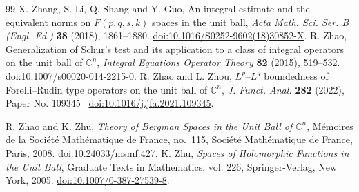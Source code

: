 \documentclass[preprint,12pt,times]{elsarticle}
\theoremstyle{definition}
\theoremstyle{remark}
\numberwithin{equation}{section}
\begin{document}
\begin{thebibliography}{99}
X. Zhang, S. Li, Q. Shang and Y. Guo,
An integral estimate and the equivalent norms on $F(p,q,s,k)$ spaces in the unit ball,
\emph{Acta Math. Sci. Ser. B (Engl. Ed.)} \textbf{38} (2018), 1861--1880. \href{https://doi.org/10.1016/S0252-9602(18)30852-X}{doi:10.1016/S0252-9602(18)30852-X}.
R. Zhao,
Generalization of Schur's test and its application to a class of integral operators on the unit ball of $\mathbb C^n$,
\emph{Integral Equations Operator Theory} \textbf{82} (2015), 519--532. \href{https://doi.org/10.1007/s00020-014-2215-0}{doi:10.1007/s00020-014-2215-0}.
R. Zhao and L. Zhou,
$L^p$--$L^q$ boundedness of Forelli--Rudin type operators on the unit ball of $\mathbb C^n$,
\emph{J. Funct. Anal.} \textbf{282} (2022), Paper No. 109345 \ \href{https://doi.org/10.1016/j.jfa.2021.109345}{doi:10.1016/j.jfa.2021.109345}.

R. Zhao and K. Zhu,
\emph{Theory of Bergman Spaces in the Unit Ball of \(\mathbb C^n\)},
M\'emoires de la Soci\'et\'e Math\'ematique de France, no.\ 115,
Soci\'et\'e Math\'ematique de France, Paris, 2008. \href{https://doi.org/10.24033/msmf.427}{doi:10.24033/msmf.427}.
K. Zhu,
\emph{Spaces of Holomorphic Functions in the Unit Ball},
Graduate Texts in Mathematics, vol. 226,
Springer-Verlag, New York, 2005. \href{https://doi.org/10.1007/0-387-27539-8}{doi:10.1007/0-387-27539-8}.
\end{thebibliography}
\end{document}
